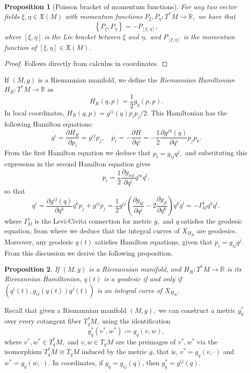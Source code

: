 \documentclass[12pt, letterpaper, reqno]{amsart}
\theoremstyle{definition}
\theoremstyle{plain}
\newtheorem{prop}{Proposition}
\theoremstyle{remark}
\begin{document}
\begin{prop}[Poisson bracket of momentum functions]\label{prop:poisson_bracket_momentum}
	For any two vector fields $ \xi,\eta \in \mathfrak{X}(M) $ with momentum functions $ P_\xi, P_\eta: T^*M \rightarrow \mathbb{R}, $ we have that
	$$ \left\{ P_\xi,P_\eta \right\} = -P_{[\xi,\eta]}, $$ 
	where $ [\xi,\eta] $ is the Lie bracket between $ \xi $ and $ \eta, $ and $ P_{[\xi,\eta]} $ is the momentum function of $ [\xi,\eta]\in \mathfrak{X}(M). $  
\end{prop}
\begin{proof}
	Follows directly from calculus in coordinates.
\end{proof}
If $ (M,g) $ is a Riemannian manifold, we define the \textit{Riemannian Hamiltonian} $ H_R: T^*M \rightarrow \mathbb{R} $ as
$$ H_R(q,p)=\frac{1}{2} g_q(p,p).$$
In local coordinates, $  H_R(q,p)= g^{ij}(q)p_ip_j/2. $ This Hamiltonian has the following Hamilton equations:
$$ \dot{q^i} = \frac{\partial H_R}{\partial p_i} = g^{ij}p_j, \quad \dot{p_i} = - \frac{\partial H}{\partial q^i} = - \frac{1}{2} \frac{\partial g^{jk}(q)}{\partial q^i} p_jp_k. $$ 
From the first Hamilton equation we deduce that $ p_i = g_{ij}\dot{q^j}, $ and substituting this expression in the second Hamilton equation gives $$ \dot{p_i} = \frac{1}{2} \frac{\partial g_{ml}}{\partial q^i}\dot{q^m}\dot{q^l} ,$$ so that 
$$ \ddot{q^i} = \frac{\partial g^{ij}(q)}{\partial q^k} \dot{q^k}p_j+ g^{ij}\dot{p_j}= \frac{1}{2} g^{ij} \left( \frac{\partial g_{kl}}{\partial q^j}-2 \frac{\partial g_{jl}}{\partial q^k}   \right)\dot{q^k}\dot{q^l} = -\Gamma_{kl}^i \dot{q^k}\dot{q^l},$$ 
where $ \Gamma_{kl}^i $ is the Levi-Civita connection for metric $ g, $  and $ q $ satisfies the geodesic equation, from where we deduce that the integral curves of $ X_{H_R} $ are geodesics. Moreover, any geodesic $ q(t) $ satisfies Hamilton equations, given that $ p_i = g_{ij}\dot{q^j}. $ From this discussion we derive the following proposition.

\begin{prop}\label{prop:geo}
	If $ (M,g) $ is a Riemannian manifold, and $ H_R: T^*M \rightarrow \mathbb{R} $ is its Riemannian Hamiltonian, $ q(t) $ is a geodesic if and only if $ (q^i(t), g_{ij}(q(t))\dot{q^j}(t)) $ is an integral curve of $ X_{H_R}. $ 
\end{prop}

Recall that given a Riemannian manifold $ (M,g), $ we can construct a metric $ g^*_q $  over every cotangent fiber $ T^*_q M, $ using the identification
$$ g^*_q(v^*,w^*):=g_q(v,w), $$ 
where $ v^*,w^*\in T^*_qM, $ and $ v,w\in T_qM $ are the preimages of $ v^*,w^* $ via the isomorphism $ T^*_qM\cong T_qM $ induced by the metric $ g $, that is, $ v^*=g_q(v,\cdot) $ and $ w^*=g_q(w,\cdot) $. In coordinates, if $ g_q=g_{ij}(q) $, then $ g^*_q=g^{ij}(q). $
\end{document}
